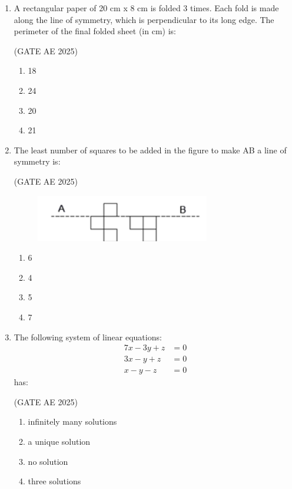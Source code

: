 \documentclass[journal,12pt,onecolumn]{IEEEtran}
\theoremstyle{remark}
\begin{document}
\begin{flushleft}
\begin{enumerate}
\item A rectangular paper of 20 cm x 8 cm is folded 3 times. Each fold is made along the line of symmetry, which is perpendicular to its long edge. The perimeter of the final folded sheet (in cm) is:

\hfill(GATE AE 2025)

\begin{enumerate}
    \item 18
    \item 24
    \item 20
    \item 21
 \end{enumerate}
 
 \item The least number of squares to be added in the figure to make AB a line of symmetry is:
 
 \hfill (GATE AE 2025)
 
\begin{figure}[h]
    \centering
    \includegraphics[width=0.5\columnwidth]{figs/boxes.png}
    \caption{}
    \label{fig:placeholder}
\end{figure}
\begin{enumerate}
    \item 6
    \item 4
    \item 5
    \item 7
\end{enumerate}

\item The following system of linear equations:
\[
\begin{aligned}
7x - 3y + z &= 0 \\
3x - y + z &= 0 \\
x - y - z &= 0
\end{aligned}
\]
has:

\hfill (GATE AE 2025)

\begin{enumerate}
    \item infinitely many solutions
    \item a unique solution
    \item no solution
    \item three solutions
\end{enumerate}


\end{enumerate}
\end{flushleft}
\end{document}

